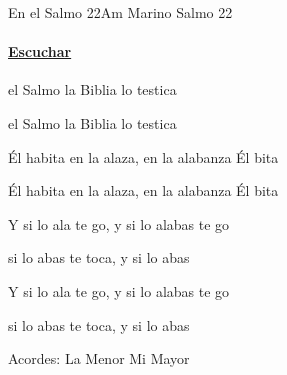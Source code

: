 \documentclass[12pt, spanish]{book}
\begin{document}
    \begin{song}{En el Salmo 22}{Am}
    {} %
    {Marino}
    {Salmo 22} %
    {}
        \ifChordBk
        \paragraph{\mbox{}\hfill\protect\href{https://open.spotify.com/intl-es/track/7bT2hTAimzZKvkyF7fWnsC}{Escuchar}\mbox{}\hfill}
        \fi

        \begin{SBOpGroup}
             el Salmo  la Biblia lo testica

             el Salmo  la Biblia lo testica

             Él habita en la alaza, en la alabanza Él bita

             Él habita en la alaza, en la alabanza Él bita
        \end{SBOpGroup}

        \begin{SBChorus}
            Y si lo ala te go, y si lo alabas te go

             si lo abas te toca, y si lo abas

            Y si lo ala te go, y si lo alabas te go

             si lo abas te toca, y si lo abas
        \end{SBChorus}

        \ifChordBk
        \begin{SBOpGroup}
            Acordes:\break
            \upchord{\Am}\qquad La Menor \hfill
            \upchord{\E}\qquad Mi Mayor \hfill\null\break
        \end{SBOpGroup}
        \fi
    \end{song}
\end{document}
